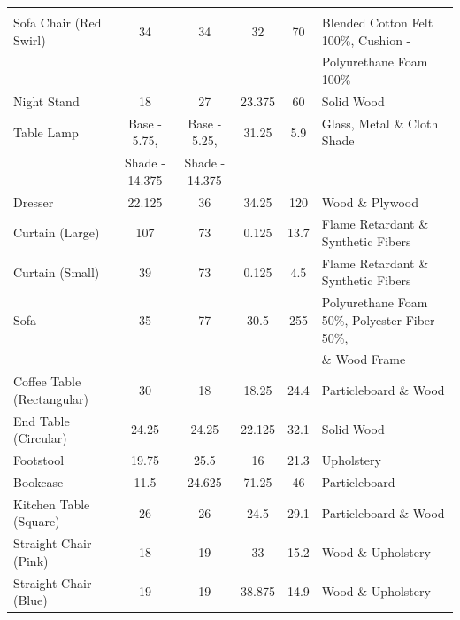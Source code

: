 \documentclass[12pt,oneside]{book}
\begin{document}
\begin{table}
{\begin{tabular}{lccccl}
\vspace{0.75em} \\ 
Sofa Chair (Red Swirl) & 34 & 34 & 32 & 70 & Blended Cotton Felt 100\%, Cushion -\\ &&&&& Polyurethane Foam 100\% 
\vspace{0.75em} \\ 
Night Stand & 18 & 27 & 23.375 & 60 & Solid Wood 
\vspace{0.75em} \\ 
Table Lamp & Base - 5.75, & Base - 5.25,  & 31.25 & 5.9 & Glass, Metal \& Cloth Shade \\& Shade - 14.375 & Shade - 14.375&&&
\vspace{0.75em} \\ 
Dresser & 22.125 & 36 & 34.25 & 120 & Wood \& Plywood 
\vspace{0.75em} \\ 
Curtain (Large) & 107 & 73 & 0.125 & 13.7 & Flame Retardant \& Synthetic Fibers 
\vspace{0.75em} \\ 
Curtain (Small) & 39 & 73 & 0.125 & 4.5 & Flame Retardant \& Synthetic Fibers 
\vspace{0.75em} \\ 
Sofa & 35 & 77 & 30.5 & 255 & Polyurethane Foam 50\%, Polyester Fiber 50\%,\\&&&&& \& Wood Frame 
\vspace{0.75em} \\ 
Coffee Table (Rectangular) & 30 & 18 & 18.25 & 24.4 & Particleboard \& Wood 
\vspace{0.75em} \\ 
End Table (Circular) & 24.25 & 24.25 & 22.125 & 32.1 & Solid Wood 
\vspace{0.75em} \\ 
Footstool & 19.75 & 25.5 & 16 & 21.3 & Upholstery 
\vspace{0.75em} \\ 
Bookcase & 11.5 & 24.625 & 71.25 & 46 & Particleboard 
\vspace{0.75em} \\ 
Kitchen Table (Square) & 26 & 26 & 24.5 & 29.1 & Particleboard \& Wood 
\vspace{0.75em} \\
Straight Chair (Pink) & 18 & 19 & 33 & 15.2 & Wood \& Upholstery 
\vspace{0.75em} \\ 
Straight Chair (Blue) & 19 & 19 & 38.875 & 14.9 & Wood \& Upholstery 
\vspace{0.75em} \\ 
\bottomrule
\end{tabular}}
\label{table:fuel_weights}
\end{table}
\end{document}
